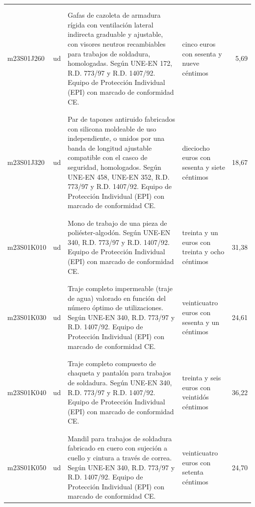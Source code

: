 \documentclass{book}%
\begin{document}
\begin{longtable}{|l|l|p{5cm}|p{3cm}|r|}
&&&&\\%
&&&&\\%
m23S01J260&ud&Gafas de cazoleta de armadura rígida con ventilación lateral indirecta graduable y ajustable, con visores neutros recambiables para trabajos de soldadura, homologadas. Según UNE{-}EN 172, R.D. 773/97 y R.D. 1407/92. Equipo de Protección Individual (EPI) con marcado de conformidad CE.&cinco euros con sesenta y nueve céntimos&5,69\\%
&&&&\\%
&&&&\\%
m23S01J320&ud&Par de tapones antiruido fabricados con silicona moldeable de uso independiente, o unidos por una banda de longitud ajustable compatible con el casco de seguridad, homologados. Según UNE{-}EN 458, UNE{-}EN 352, R.D. 773/97 y R.D. 1407/92. Equipo de Protección Individual (EPI) con marcado de conformidad CE.&dieciocho euros con sesenta y siete céntimos&18,67\\%
&&&&\\%
&&&&\\%
m23S01K010&ud&Mono de trabajo de una pieza de poliéster{-}algodón. Según UNE{-}EN 340, R.D. 773/97 y R.D. 1407/92. Equipo de Protección Individual (EPI) con marcado de conformidad CE.&treinta y un euros con treinta y ocho céntimos&31,38\\%
&&&&\\%
&&&&\\%
m23S01K030&ud&Traje completo impermeable (traje de agua) valorado en función del número óptimo de utilizaciones. Según UNE{-}EN 340, R.D. 773/97 y R.D. 1407/92. Equipo de Protección Individual (EPI) con marcado de conformidad CE.&veinticuatro euros con sesenta y un céntimos&24,61\\%
&&&&\\%
&&&&\\%
m23S01K040&ud&Traje completo compuesto de chaqueta y pantalón para trabajos de soldadura. Según UNE{-}EN 340, R.D. 773/97 y R.D. 1407/92. Equipo de Protección Individual (EPI) con marcado de conformidad CE.&treinta y seis euros con veintidós céntimos&36,22\\%
&&&&\\%
&&&&\\%
m23S01K050&ud&Mandil para trabajos de soldadura fabricado en cuero con sujeción a cuello y cintura a través de correa. Según UNE{-}EN 340, R.D. 773/97 y R.D. 1407/92. Equipo de Protección Individual (EPI) con marcado de conformidad CE.&veinticuatro euros con setenta céntimos&24,70\\%

\end{longtable}
\end{document}
